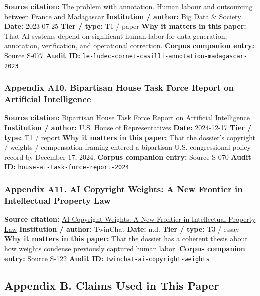 \documentclass[
  american,
  11pt,
  letterpaper,
]{article}
\begin{document}
\textbf{Source citation:}
\href{https://journals.sagepub.com/doi/10.1177/20539517231188723}{The
problem with annotation. Human labour and outsourcing between France and
Madagascar} \textbf{Institution / author:} Big Data \& Society
\textbf{Date:} 2023-07-25 \textbf{Tier / type:} T1 / paper \textbf{Why
it matters in this paper:} That AI systems depend on significant human
labor for data generation, annotation, verification, and operational
correction. \textbf{Corpus companion entry:} Source S-077 \textbf{Audit
ID:} \texttt{le-ludec-cornet-casilli-annotation-madagascar-2023}

\subsubsection{Appendix A10. Bipartisan House Task Force Report on
Artificial
Intelligence}\label{ch-04-appendix-a10-bipartisan-house-task-force-report-on-artificial-intelligence}

\textbf{Source citation:}
\href{https://www.speaker.gov/wp-content/uploads/2024/12/AI-Task-Force-Report-FINAL.pdf}{Bipartisan
House Task Force Report on Artificial Intelligence} \textbf{Institution
/ author:} U.S. House of Representatives \textbf{Date:} 2024-12-17
\textbf{Tier / type:} T1 / report \textbf{Why it matters in this paper:}
That the dossier's copyright / weights / compensation framing entered a
bipartisan U.S. congressional policy record by December 17, 2024.
\textbf{Corpus companion entry:} Source S-070 \textbf{Audit ID:}
\texttt{house-ai-task-force-report-2024}

\subsubsection{Appendix A11. AI Copyright Weights: A New Frontier in
Intellectual Property
Law}\label{ch-04-appendix-a11-ai-copyright-weights-a-new-frontier-in-intellectual-property-law}

\textbf{Source citation:}
\href{https://medium.com/twinchat/ai-copyright-weights-a-new-frontier-in-intellectual-property-law-d8ee1b6c55ee}{AI
Copyright Weights: A New Frontier in Intellectual Property Law}
\textbf{Institution / author:} TwinChat \textbf{Date:} n.d. \textbf{Tier
/ type:} T3 / essay \textbf{Why it matters in this paper:} That the
dossier has a coherent thesis about how weights condense previously
captured human labor. \textbf{Corpus companion entry:} Source S-122
\textbf{Audit ID:} \texttt{twinchat-ai-copyright-weights}

\subsection{Appendix B. Claims Used in This
Paper}\label{appendix-b.-claims-used-in-this-paper-4}
\end{document}
